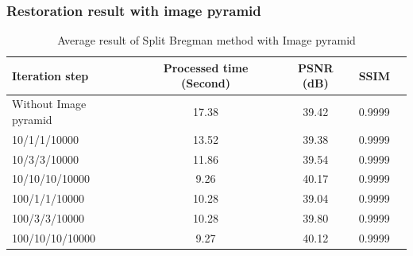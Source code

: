 \documentclass[xcolor=dvipsnames, xetex,serif]{beamer}
\begin{document}
    \begin{frame}
        \frametitle{Restoration result with image pyramid}
        \begin{table}[H]
            \centering
            \begin{tabular}[ht]{|l|c|c|c|c|}
                \hline
                Iteration step  & Processed time  (Second) & PSNR (dB) & SSIM \\
                \hline
                Without Image pyramid & 17.38 & 39.42 & 0.9999 \\
                10/1/1/10000 & 13.52 & 39.38 & 0.9999 \\
                10/3/3/10000 & 11.86 & 39.54 & 0.9999 \\
                10/10/10/10000 & 9.26 & 40.17 & 0.9999\\
                100/1/1/10000 & 10.28 & 39.04 & 0.9999\\
                100/3/3/10000 & 10.28 & 39.80 & 0.9999\\
                100/10/10/10000 & 9.27 & 40.12 & 0.9999 \\
                \hline
            \end{tabular}
            \caption{Average result of Split Bregman method with Image pyramid}
        \end{table}	
    \end{frame}
\end{document}
